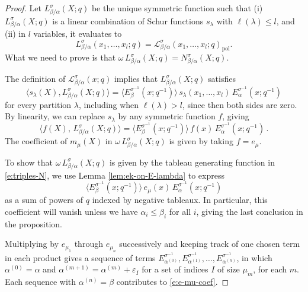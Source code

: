 \documentclass[12pt]{amsart}
\theoremstyle{definition}
\theoremstyle{remark}
\newcommand{\Lcal}{{\mathcal L}}
\DeclareMathOperator{\pol}{pol}
\begin{document}
\begin{proof}
Let $L^{\sigma}_{\beta/\alpha}(X;q)$
be the unique symmetric function such that (i)
$L^{\sigma }_{\beta /\alpha }(X;q)$ is a linear combination of Schur
functions $s_{\lambda }$ with $\ell(\lambda )\leq l$, and (ii) in $l$
variables, it evaluates to
\begin{equation}\label{e:L-vs-Lcal}
L^{\sigma }_{\beta /\alpha }(x_{1},\ldots,x_{l};q) = \Lcal ^{\sigma
}_{\beta /\alpha }(x_{1},\ldots,x_{l};q)_{\pol }.
\end{equation}
What we need to prove is that $\omega\, L^{\sigma }_{\beta /\alpha
}(X;q) = N^{\sigma }_{\beta /\alpha }(X;q)$.

The definition of $\Lcal ^{\sigma }_{\beta /\alpha }(x;q)$ implies
that $L^{\sigma }_{\beta /\alpha }(X;q)$ satisfies
\begin{equation}\label{e:L(X)}
\langle s_{\lambda }(X), L^{\sigma }_{\beta /\alpha }(X;q) \rangle =
\langle E^{\sigma ^{-1}}_{\beta }(x;q^{-1}) \rangle\, s_{\lambda
}(x_{1},\ldots,x_{l})\, E^{\sigma ^{-1}}_{\alpha }(x;q^{-1})
\end{equation}
for every partition $\lambda $, including when $\ell(\lambda ) > l$,
since then both sides are zero.  By linearity, we can replace
$s_\lambda$ by any symmetric function $f$, giving
\begin{equation}\label{e:G-anyf}
\langle f(X),\, L^\sigma_{\beta/\alpha}(X;q)
\rangle = \langle E^{\sigma ^{-1}}_{\beta
}(x;q^{-1}) \rangle\, f(x)\, E^{\sigma ^{-1}}_{\alpha
}(x;q^{-1})\,.
\end{equation}
The coefficient of $m_\mu(X)$ in $\omega\,
L^\sigma_{\beta/\alpha}(X;q)$ is given by taking $f=e_\mu$.

To show that $\omega\, L^{\sigma }_{\beta /\alpha }(X;q)$ is given by
the tableau generating function in \eqref{e:triples-N}, we use Lemma
\ref{lem:ek-on-E-lambda} to express
\begin{equation}\label{e:e-mu-coef}
\langle E^{\sigma ^{-1}}_{\beta }(x;q^{-1}) \rangle\,  e_{\mu  }(x)\,
E^{\sigma ^{-1}}_{\alpha }(x;q^{-1})
\end{equation}
as a sum of powers of $q$ indexed by negative tableaux.  In
particular, this coefficient will vanish unless we have $\alpha
_{i}\leq \beta _{i}$ for all $i$, giving the last conclusion in the
proposition.

Multiplying by $e_{\mu _{1}}$ through $e_{\mu _{n}}$ successively and
keeping track of one chosen term in each product gives a sequence of
terms $E^{\sigma ^{-1}}_{\alpha ^{(0)}}, E^{\sigma ^{-1}}_{\alpha
^{(1)}},\ldots, E^{\sigma ^{-1}}_{\alpha ^{(n)}}$, in which $\alpha
^{(0)} = \alpha $ and $\alpha ^{(m+1)} = \alpha ^{(m)} + \varepsilon
_{I}$ for a set of indices $I$ of size $\mu _{m}$, for each $m$.  Each
sequence with $\alpha ^{(n)} = \beta $ contributes to \eqref{e:e-mu-coef}.


\end{proof}
\end{document}
